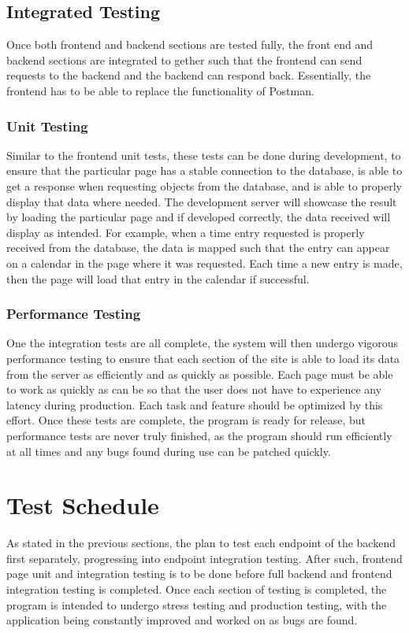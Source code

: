 {{{\subsection{Integrated Testing}
Once both frontend and backend sections are tested fully, the front end and backend sections are integrated to gether such that the frontend can send requests to the backend and the backend can respond back. Essentially, the frontend has to be able to replace the functionality of Postman. 

\subsubsection{Unit Testing}
Similar to the frontend unit tests, these tests can be done during development, to ensure that the particular page has a stable connection to the database, is able to get a response when requesting objects from the database, and is able to properly  display that data where needed. The development server will showcase the result by loading the particular page and if developed correctly, the data received will display as intended. For example, when a time entry requested is properly received from the database, the data is mapped such that the entry can appear on a calendar in the page where it was requested. Each time a new entry is made, then the page will load that entry in the calendar if successful. 

\subsubsection{Performance Testing}
One the integration tests are all complete, the system will then undergo vigorous performance testing to ensure that each section of the site is able to load its data from the server as efficiently and as quickly as possible. Each page must be able to work as quickly as can be so that the user does not have to experience any latency during production. Each task and feature should be optimized by this effort. Once these tests are complete, the program is ready for release, but performance tests are never truly finished, as the program should run efficiently at all times and any bugs found during use can be patched quickly. 

\newpage
\section{Test Schedule}
As stated in the previous sections, the plan to test each endpoint of the backend first separately, progressing into endpoint integration testing. After such, frontend page unit and integration testing is to be done before full backend and frontend integration testing is completed. Once each section of testing is completed, the program is intended to undergo stress testing and production testing, with the application being constantly improved and worked on as bugs are found.

}}}
